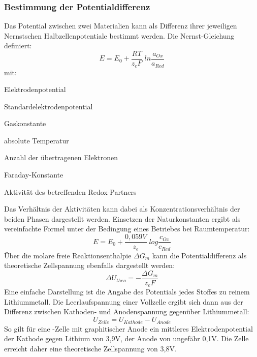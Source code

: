 \documentclass[a4paper, 11pt, headsepline,footsepline,twoside,abstract]{scrbook}
\begin{document}
\subsubsection{Bestimmung der Potentialdifferenz}
Das Potential zwischen zwei Materialien kann als Differenz ihrer jeweiligen Nernstschen Halbzellenpotentiale bestimmt werden. Die Nernst-Gleichung definiert:
\begin{equation}
E = E_0 + \frac{RT}{z_eF}\; ln \frac{a_{Ox}}{a_{Red}}
\end{equation}
mit:
\begin{description}\itemsep0pt
\item[E] Elektrodenpotential
\item[E$_0$] Standardelektrodenpotential
\item[R] Gaskonstante
\item[T] absolute Temperatur
\item[z$_e$] Anzahl der übertragenen Elektronen
\item[F] Faraday-Konstante
\item[a] Aktivität des betreffenden Redox-Partners
\end{description}
Das Verhältnis der Aktivitäten kann dabei als Konzentrationsverhältnis der beiden Phasen dargestellt werden. Einsetzen der Naturkonstanten ergibt als vereinfachte Formel unter der Bedingung eines Betriebes bei Raumtemperatur:
\begin{equation}
E = E_0 + \frac{0,059 V}{z_e} \; log \frac{c_{Ox}}{c_{Red}}
\end{equation}
Über die molare freie Reaktionsenthalpie $\Delta G_m$ kann die Potentialdifferenz als theoretische Zellspannung ebenfalls dargestellt werden:
\begin{equation}
\Delta U_{theo} = -\frac{\Delta G_m}{z_eF}
\end{equation}
Eine einfache Darstellung ist die Angabe des Potentials jedes Stoffes zu reinem Lithiummetall. Die Leerlaufspannung einer Vollzelle ergibt sich dann aus der Differenz zwischen Kathoden- und Anodenspannung gegenüber Lithiummetall:
\begin{equation}
U_{Zelle} = U_{Kathode} - U_{Anode}
\end{equation}
So gilt für eine -Zelle mit graphitischer Anode ein mittleres Elektrodenpotential der Kathode gegen Lithium von 3,9V, der Anode von ungefähr 0,1V. Die Zelle erreicht daher eine theoretische Zellspannung von 3,8V.
\end{document}
